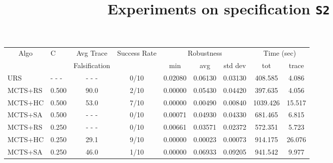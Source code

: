 \documentclass[11pt]{article}
\begin{document}
\begin{table}[ht]
\centering
\title{Experiments on specification \texttt{S2}}
\begin{tabular}{|l|l|c|c|c|c|c|c|c|}
\hline
\multicolumn{1}{|c|}{\multirow{2}{*}{Algo}} & \multirow{2}{*}{C} & Avg Trace               & \multirow{2}{*}{Success Rate} & \multicolumn{3}{c|}{Robustness} & \multicolumn{2}{c|}{Time (sec)} \\ \cline{5-9} 
\multicolumn{1}{|c|}{}                      &                    & Falsification           &                               & min       & avg      & std dev  & tot        & trace        \\ \hline
URS                                         & - - -              & - - -                   & 0/10                          & 0.02080   & 0.06130  & 0.03130  &  408.585   &  4.086       \\ \hline
MCTS+RS                                     & 0.500              &  90.0                   & 2/10                          & 0.00000   & 0.05430  & 0.04420  &  397.635   &  4.056       \\
MCTS+HC                                     & 0.500              &  53.0                   & 7/10                          & 0.00000   & 0.00490  & 0.00840  & 1039.426   & 15.517       \\
MCTS+SA                                     & 0.500              & - - -                   & 0/10                          & 0.00071   & 0.04930  & 0.04330  &  681.465   &  6.815       \\ \hline
MCTS+RS                                     & 0.250              & - - -                   & 0/10                          & 0.00661   & 0.03571  & 0.02372  &  572.351   &  5.723       \\
MCTS+HC                                     & 0.250              &  29.1                   & 9/10                          & 0.00000   & 0.00023  & 0.00073  &  914.175   & 26.076       \\
MCTS+SA                                     & 0.250              &  46.0                   & 1/10                          & 0.00000   & 0.06933  & 0.09205  &  941.542   &  9.977       \\ \hline


\end{tabular}
\end{table}
\end{document}
